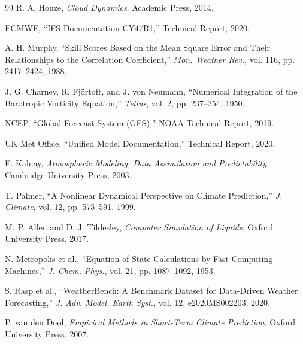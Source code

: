 \documentclass[twocolumn,10pt,a4paper]{article}
\theoremstyle{definition}
\theoremstyle{remark}
\begin{document}
\begin{thebibliography}{99}
R. A. Houze,
\textit{Cloud Dynamics},
Academic Press, 2014.

ECMWF,
``IFS Documentation CY47R1,''
Technical Report, 2020.

A. H. Murphy,
``Skill Scores Based on the Mean Square Error and Their Relationships to the Correlation Coefficient,''
\textit{Mon. Weather Rev.}, vol. 116, pp. 2417--2424, 1988.

J. G. Charney, R. Fjörtoft, and J. von Neumann,
``Numerical Integration of the Barotropic Vorticity Equation,''
\textit{Tellus}, vol. 2, pp. 237--254, 1950.

NCEP,
``Global Forecast System (GFS),''
NOAA Technical Report, 2019.

UK Met Office,
``Unified Model Documentation,''
Technical Report, 2020.

E. Kalnay,
\textit{Atmospheric Modeling, Data Assimilation and Predictability},
Cambridge University Press, 2003.

T. Palmer,
``A Nonlinear Dynamical Perspective on Climate Prediction,''
\textit{J. Climate}, vol. 12, pp. 575--591, 1999.

M. P. Allen and D. J. Tildesley,
\textit{Computer Simulation of Liquids},
Oxford University Press, 2017.

N. Metropolis et al.,
``Equation of State Calculations by Fast Computing Machines,''
\textit{J. Chem. Phys.}, vol. 21, pp. 1087--1092, 1953.

S. Rasp et al.,
``WeatherBench: A Benchmark Dataset for Data-Driven Weather Forecasting,''
\textit{J. Adv. Model. Earth Syst.}, vol. 12, e2020MS002203, 2020.

P. van den Dool,
\textit{Empirical Methods in Short-Term Climate Prediction},
Oxford University Press, 2007.

\end{thebibliography}
\end{document}
